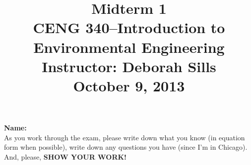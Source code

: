 \documentclass[12pt,letterpaper]{article}
\begin{document}
\setlength{\parindent}{0cm} 


\frenchspacing

\title {\Large{\textbf{Midterm 1}}\\ \large{CENG 340--Introduction to Environmental Engineering\\
Instructor: Deborah Sills\\ \textbf{October 9, 2013}}}
\author {}
\date {}
\maketitle

\vspace{-1.5cm}

\textbf{\Large{Name:}}\\

As you work through the exam, please write down what you know (in equation form when possible), write down any questions you have (since I'm in Chicago).  And, please, \textbf{SHOW YOUR WORK!}
\end{document}
